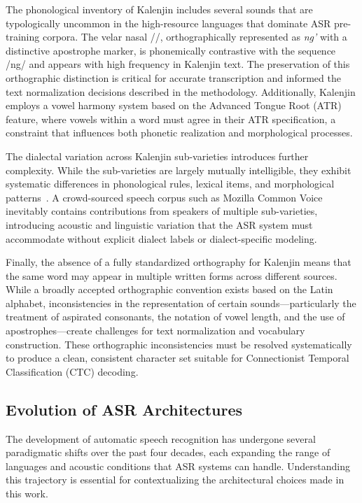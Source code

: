 \documentclass[journal]{IEEEtran}
\begin{document}
The phonological inventory of Kalenjin includes several sounds that are typologically uncommon in the high-resource languages that dominate ASR pre-training corpora. The velar nasal /\ng/, orthographically represented as \textit{ng'} with a distinctive apostrophe marker, is phonemically contrastive with the sequence /ng/ and appears with high frequency in Kalenjin text. The preservation of this orthographic distinction is critical for accurate transcription and informed the text normalization decisions described in the methodology. Additionally, Kalenjin employs a vowel harmony system based on the Advanced Tongue Root (ATR) feature, where vowels within a word must agree in their ATR specification, a constraint that influences both phonetic realization and morphological processes.

The dialectal variation across Kalenjin sub-varieties introduces further complexity. While the sub-varieties are largely mutually intelligible, they exhibit systematic differences in phonological rules, lexical items, and morphological patterns~\cite{toweett1979study}. A crowd-sourced speech corpus such as Mozilla Common Voice inevitably contains contributions from speakers of multiple sub-varieties, introducing acoustic and linguistic variation that the ASR system must accommodate without explicit dialect labels or dialect-specific modeling.

Finally, the absence of a fully standardized orthography for Kalenjin means that the same word may appear in multiple written forms across different sources. While a broadly accepted orthographic convention exists based on the Latin alphabet, inconsistencies in the representation of certain sounds---particularly the treatment of aspirated consonants, the notation of vowel length, and the use of apostrophes---create challenges for text normalization and vocabulary construction. These orthographic inconsistencies must be resolved systematically to produce a clean, consistent character set suitable for Connectionist Temporal Classification (CTC) decoding.

\subsection{Evolution of ASR Architectures}

The development of automatic speech recognition has undergone several paradigmatic shifts over the past four decades, each expanding the range of languages and acoustic conditions that ASR systems can handle. Understanding this trajectory is essential for contextualizing the architectural choices made in this work.
\end{document}
